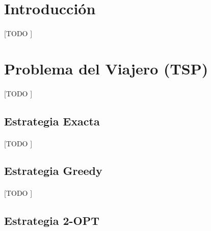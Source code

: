 \documentclass[spanish]{article}
\begin{document}
	\maketitle %

	\thispagestyle{fancy} %



	\begin{abstract}
		\noindent [TODO ]
	\end{abstract}


	\section{Introducción}
	\label{sec:intro}

		\paragraph{}
		[TODO ]

	\section{Problema del Viajero (TSP)}

		\paragraph{}
		[TODO ]

		\subsection{Estrategia Exacta}

			\paragraph{}
			[TODO ]

		\subsection{Estrategia Greedy}

			\paragraph{}
			[TODO ]


		\subsection{Estrategia 2-OPT}
\end{document}
